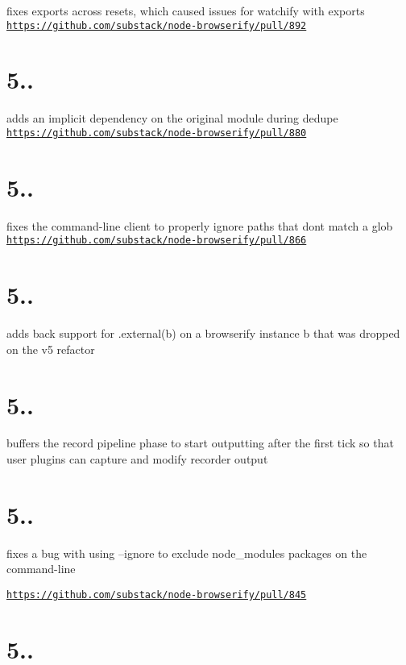 fixes exports across resets, which caused issues for watchify with exports \href{https://github.com/substack/node-browserify/pull/892}{\tt https\+://github.\+com/substack/node-\/browserify/pull/892}

\section*{5..}

adds an implicit dependency on the original module during dedupe \href{https://github.com/substack/node-browserify/pull/880}{\tt https\+://github.\+com/substack/node-\/browserify/pull/880}

\section*{5..}

fixes the command-\/line client to properly ignore paths that don\textquotesingle{}t match a glob \href{https://github.com/substack/node-browserify/pull/866}{\tt https\+://github.\+com/substack/node-\/browserify/pull/866}

\section*{5..}

adds back support for {\ttfamily .external(b)} on a browserify instance {\ttfamily b} that was dropped on the v5 refactor

\section*{5..}

buffers the record pipeline phase to start outputting after the first tick so that user plugins can capture and modify recorder output

\section*{5..}

fixes a bug with using --ignore to exclude node\+\_\+modules packages on the command-\/line

\href{https://github.com/substack/node-browserify/pull/845}{\tt https\+://github.\+com/substack/node-\/browserify/pull/845}

\section*{5..}

